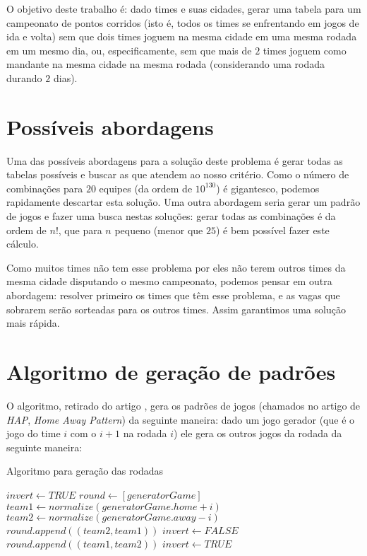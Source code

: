 \documentclass[a4paper,12pt,titlepage]{article}
\begin{document}
O objetivo deste trabalho é: dado times e suas cidades, gerar uma tabela para um campeonato de pontos corridos (isto é, todos os times
se enfrentando em jogos de ida e volta) sem que dois times joguem na mesma cidade em uma mesma rodada em um mesmo dia, 
ou, especificamente, sem que mais de $2$ times joguem como mandante na mesma cidade na 
mesma rodada (considerando uma rodada durando $2$ dias). 


\section{Possíveis abordagens}

Uma das possíveis abordagens para a solução deste problema é gerar todas as tabelas possíveis e buscar as que atendem ao nosso critério. 
Como o número de combinações para $20$ equipes (da ordem de $10^{130}$) é gigantesco, podemos rapidamente descartar esta solução. Uma outra abordagem
seria gerar um padrão de jogos e fazer uma busca nestas soluções: gerar todas as combinações é da ordem de $n!$, que para $n$ pequeno (menor que $25$)
é bem possível fazer este cálculo. 

Como muitos times não tem esse problema por eles não terem outros times da mesma cidade disputando o mesmo campeonato, podemos pensar em outra abordagem:
resolver primeiro os times que têm esse problema, e as vagas que sobrarem serão sorteadas para os outros times. Assim garantimos uma solução mais rápida.

\section{Algoritmo de geração de padrões}

O algoritmo, retirado do artigo \cite{90Schreuder}, gera os padrões de jogos (chamados no artigo de \textit{HAP}, 
\textit{Home Away Pattern}) da seguinte maneira: dado um jogo gerador 
(que é o jogo do time $i$ com o $i+1$ na rodada $i$) ele gera os outros jogos da rodada da seguinte maneira:

\begin{algorithm}
\caption{Algoritmo para geração das rodadas}
\label{HAP}
\begin{algorithmic}
\STATE $invert \leftarrow TRUE$
\STATE $round \leftarrow [generatorGame]$
	\STATE $team1 \leftarrow normalize(generatorGame.home + i)$
	\STATE $team2 \leftarrow normalize(generatorGame.away-i)$
		\STATE $round.append((team2,team1))$
		\STATE $invert \leftarrow FALSE$
	\ELSE
		\STATE $round.append((team1,team2))$
		\STATE $invert \leftarrow TRUE$
	\ENDIF
\ENDFOR
\end{algorithmic}
\end{algorithm}
\end{document}
